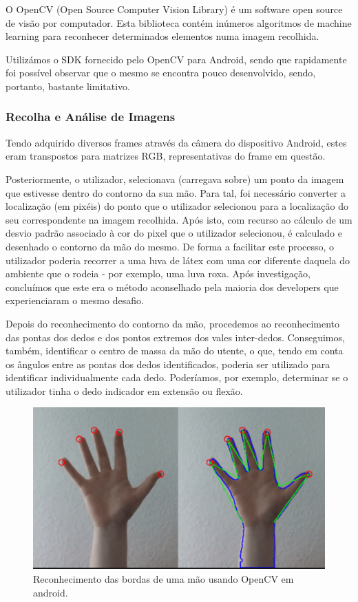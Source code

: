 \documentclass{TTUPhD}
\begin{document}
O OpenCV (Open Source Computer Vision Library)  é um software open source de visão por computador.
Esta biblioteca contém inúmeros algoritmos de machine learning para reconhecer determinados elementos numa imagem recolhida.

Utilizámos o SDK fornecido pelo OpenCV para Android, sendo que rapidamente foi possível observar que o mesmo se encontra pouco desenvolvido, sendo, portanto, bastante limitativo.

\subsubsection{Recolha e Análise de Imagens}

Tendo adquirido diversos frames através da câmera do dispositivo Android, estes eram transpostos para matrizes RGB, representativas do frame em questão.

Posteriormente, o utilizador, selecionava (carregava sobre) um ponto da imagem que estivesse dentro do contorno da sua mão.
Para tal, foi necessário converter a localização (em pixéis) do ponto que o utilizador selecionou para a localização do seu correspondente na imagem recolhida.
Após isto, com recurso ao cálculo de um desvio padrão associado à cor do pixel que o utilizador selecionou, é calculado e desenhado o contorno da mão do mesmo.
De forma a facilitar este processo, o utilizador poderia recorrer a uma luva de látex com uma cor diferente daquela do ambiente que o rodeia -
por exemplo, uma luva roxa. Após investigação, concluímos que este era o método aconselhado pela maioria dos developers que experienciaram o mesmo desafio.

Depois do reconhecimento do contorno da mão, procedemos ao reconhecimento das pontas dos dedos e dos pontos extremos dos vales inter-dedos.
Conseguimos, também, identificar o centro de massa da mão do utente, o que, tendo em conta os ângulos entre as pontas dos dedos identificados,
poderia ser utilizado para identificar individualmente cada dedo. Poderíamos, por exemplo, determinar se o utilizador tinha o dedo indicador em extensão ou flexão.

\begin{figure}[h!]
    \center
    \includegraphics[scale=0.5]{./img/opencv1.png}
    \caption{Reconhecimento das bordas de uma mão usando OpenCV em android.}
    \label{fig:opencv1}
\end{figure}
\end{document}
